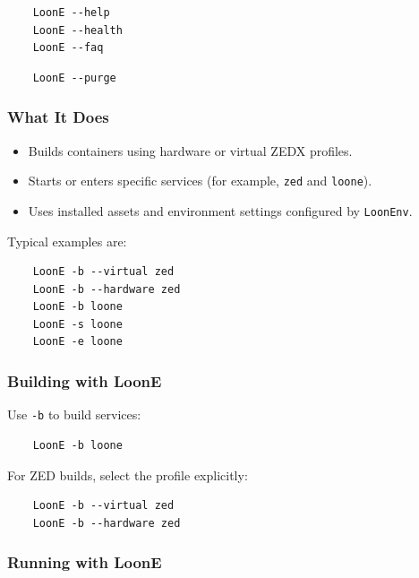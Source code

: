 \begin{verbatim}
    LoonE --help
    LoonE --health
    LoonE --faq
\end{verbatim}

\begin{verbatim}
    LoonE --purge
\end{verbatim}

\subsubsection{What It Does}

\begin{itemize}
 \item Builds containers using hardware or virtual ZEDX profiles.
 \item Starts or enters specific services (for example, \texttt{zed} and \texttt{loone}).
 \item Uses installed assets and environment settings configured by \texttt{LoonEnv}.
\end{itemize}

Typical examples are:

\begin{verbatim}
    LoonE -b --virtual zed
    LoonE -b --hardware zed
    LoonE -b loone
    LoonE -s loone
    LoonE -e loone
\end{verbatim}

\subsubsection{Building with LoonE}

Use \texttt{-b} to build services:

\begin{verbatim}
    LoonE -b loone
\end{verbatim}

For ZED builds, select the profile explicitly:

\begin{verbatim}
    LoonE -b --virtual zed
    LoonE -b --hardware zed
\end{verbatim}

\subsubsection{Running with LoonE}

